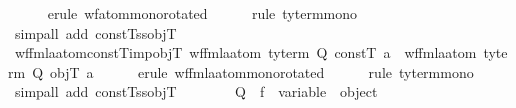 \begin{isabellebody}
%
\isadelimproof
\ \ \ \ %
\endisadelimproof
%
\isatagproof
{}\isamarkupfalse%
\ {\isacharparenleft}{\kern0pt}erule\ wf{\isacharunderscore}{\kern0pt}atom{\isacharunderscore}{\kern0pt}mono{\isacharbrackleft}{\kern0pt}rotated{\isacharbrackright}{\kern0pt}{\isacharparenright}{\kern0pt}\isanewline
\ \ \ \ \isamarkupfalse%
\ {\isacharparenleft}{\kern0pt}rule\ ty{\isacharunderscore}{\kern0pt}term{\isacharunderscore}{\kern0pt}mono{\isacharparenright}{\kern0pt}\isanewline
\ \ \ \ \isamarkupfalse%
\ {\isacharparenleft}{\kern0pt}simp{\isacharunderscore}{\kern0pt}all\ add{\isacharcolon}{\kern0pt}\ constT{\isacharunderscore}{\kern0pt}ss{\isacharunderscore}{\kern0pt}objT{\isacharparenright}{\kern0pt}%
\endisatagproof
{\isafoldproof}%
%
\isadelimproof
\isanewline
%
\endisadelimproof
\isanewline
\ \ \isamarkupfalse%
\ wf{\isacharunderscore}{\kern0pt}fmla{\isacharunderscore}{\kern0pt}atom{\isacharunderscore}{\kern0pt}constT{\isacharunderscore}{\kern0pt}imp{\isacharunderscore}{\kern0pt}objT{\isacharcolon}{\kern0pt}\ {\isachardoublequoteopen}wf{\isacharunderscore}{\kern0pt}fmla{\isacharunderscore}{\kern0pt}atom\ {\isacharparenleft}{\kern0pt}ty{\isacharunderscore}{\kern0pt}term\ Q\ constT{\isacharparenright}{\kern0pt}\ a\ {\isasymLongrightarrow}\ wf{\isacharunderscore}{\kern0pt}fmla{\isacharunderscore}{\kern0pt}atom\ {\isacharparenleft}{\kern0pt}ty{\isacharunderscore}{\kern0pt}term\ Q\ objT{\isacharparenright}{\kern0pt}\ a{\isachardoublequoteclose}\isanewline
%
\isadelimproof
\ \ \ \ %
\endisadelimproof
%
\isatagproof
{}\isamarkupfalse%
\ {\isacharparenleft}{\kern0pt}erule\ wf{\isacharunderscore}{\kern0pt}fmla{\isacharunderscore}{\kern0pt}atom{\isacharunderscore}{\kern0pt}mono{\isacharbrackleft}{\kern0pt}rotated{\isacharbrackright}{\kern0pt}{\isacharparenright}{\kern0pt}\isanewline
\ \ \ \ \isamarkupfalse%
\ {\isacharparenleft}{\kern0pt}rule\ ty{\isacharunderscore}{\kern0pt}term{\isacharunderscore}{\kern0pt}mono{\isacharparenright}{\kern0pt}\isanewline
\ \ \ \ \isamarkupfalse%
\ {\isacharparenleft}{\kern0pt}simp{\isacharunderscore}{\kern0pt}all\ add{\isacharcolon}{\kern0pt}\ constT{\isacharunderscore}{\kern0pt}ss{\isacharunderscore}{\kern0pt}objT{\isacharparenright}{\kern0pt}%
\endisatagproof
{\isafoldproof}%
%
\isadelimproof
\isanewline
%
\endisadelimproof
\isanewline
\ \ \isamarkupfalse%
\isanewline
\ \ \ \ \ Q\ \ f\ {\isacharcolon}{\kern0pt}{\isacharcolon}{\kern0pt}\ {\isachardoublequoteopen}variable\ {\isasymRightarrow}\ object{\isachardoublequoteclose}\isanewline

\end{isabellebody}
